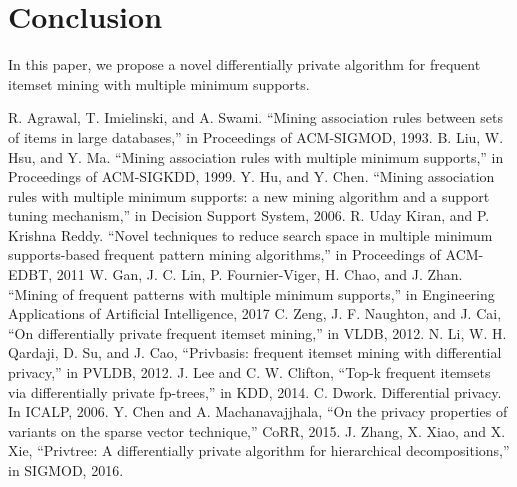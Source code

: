 \documentclass[conference]{IEEEtran}
\begin{document}


\section{Conclusion}
In this paper, we propose a novel differentially private algorithm for frequent itemset mining with multiple minimum supports.


\begin{thebibliography}{00}%
 R. Agrawal, T. Imielinski, and A. Swami. ``Mining association rules between sets of items in large databases,'' in Proceedings of ACM-SIGMOD, 1993.
 B. Liu, W. Hsu, and Y. Ma. ``Mining association rules with multiple minimum supports,'' in Proceedings of ACM-SIGKDD, 1999.
 Y. Hu, and Y. Chen. ``Mining association rules with multiple minimum supports: a new mining algorithm and a support tuning mechanism,'' in Decision Support System, 2006.
 R. Uday Kiran, and P. Krishna Reddy. ``Novel techniques to reduce search space in multiple minimum supports-based frequent pattern mining algorithms,'' in Proceedings of ACM-EDBT, 2011
 W. Gan, J. C. Lin, P. Fournier-Viger, H. Chao, and J. Zhan. ``Mining of frequent patterns with multiple minimum supports,'' in Engineering Applications of Artificial Intelligence, 2017
 C. Zeng, J. F. Naughton, and J. Cai, ``On differentially private frequent itemset mining,'' in VLDB, 2012.
 N. Li, W. H. Qardaji, D. Su, and J. Cao, ``Privbasis: frequent itemset mining with differential privacy,'' in PVLDB, 2012.
 J. Lee and C. W. Clifton, ``Top-k frequent itemsets via differentially private fp-trees,'' in KDD, 2014.
 C. Dwork. Differential privacy. In ICALP, 2006.
Y. Chen and A. Machanavajjhala, “On the privacy properties of variants on the sparse vector technique,” CoRR, 2015.
J. Zhang, X. Xiao, and X. Xie, “Privtree: A differentially private algorithm for hierarchical decompositions,” in SIGMOD, 2016.

\end{thebibliography}
\end{document}
